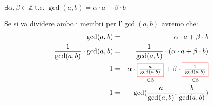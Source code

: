 \begin{itemize}[nosep]
\begin{boxA}
        {\centering
            $\exists \alpha, \beta \in \mathbb{Z} \; \text{t.c.} \; \gcd(a, b) = \alpha \cdot a + \beta \cdot b$
        \par}
        Se si va dividere ambo i membri per l'$\gcd (a, b)$ avremo che:
        \begin{align*}
            \gcd(a, b) &=& \alpha \cdot a + \beta \cdot b \\
            \frac{1}{\gcd (a, b)} \cdot \gcd (a, b) &=& \frac{1}{\gcd (a, b)} \cdot (\alpha \cdot a + \beta \cdot b) \\
            1 &=& \alpha \cdot \underset{\in \mathbb{Z}}{\fcolorbox{red}{white}{$\frac{a}{\gcd (a, b)}$}} + \beta \cdot \underset{\in \mathbb{Z}}{\fcolorbox{red}{white}{$\frac{1}{\gcd (a, b)}$}} \\
            1 &=& \gcd (\frac{a}{\gcd (a, b)}, \frac{b}{\gcd (a, b)})
        \end{align*}
    \end{boxA}
\end{itemize}
